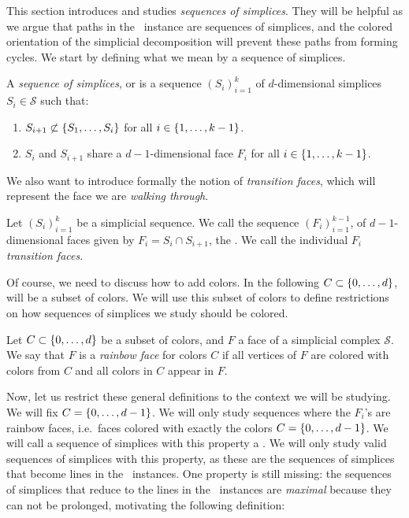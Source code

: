 This section introduces and studies \emph{sequences of simplices}.  They will be helpful as we argue that paths in the \EndOfLine\ instance are sequences of simplices, and the colored orientation of the simplicial decomposition will prevent these paths from forming cycles. We start by defining what we mean by a sequence of simplices.

\begin{definition}
	\label{def:sequence_of_simplices}
	A \emph{sequence of simplices}, or  is a sequence $\left(S_i\right)_{i=1}^{k}$ of $d$-dimensional simplices $S_i \in \mathcal{S}$ such that:
	\begin{enumerate}
		\item $S_{i+1} \not\subset \left\{S_1, \dots, S_i\right\}$ for all $i \in \left\{1, \dots, k-1\right\}$.
		\item $S_i$ and $S_{i+1}$ share a $d-1$-dimensional face $F_i$ for all $i \in \left\{1, \dots, k-1\right\}$.
	\end{enumerate}
\end{definition}

We also want to introduce formally the notion of \emph{transition faces}, which will represent the face we are \emph{walking through}.

\begin{definition}
	\label{def:transition_faces}
	Let $\left(S_i\right)_{i=1}^{k}$ be a simplicial sequence. We call the sequence $\left(F_i\right)_{i=1}^{k-1}$, of $d-1$-dimensional faces given by $F_i = S_i \cap S_{i+1}$, the . We call the individual $F_i$ \emph{transition faces}.
\end{definition}

Of course, we need to discuss how to add colors. In the following $C \subset \left\{0, \dots, d\right\}$, will be a subset of colors. We will use this subset of colors to define restrictions on how sequences of simplices we study should be colored.

\begin{definition}
	Let $C \subset \left\{0, \dots, d\right\}$ be a subset of colors, and $F$ a face of a simplicial complex $\mathcal{S}$. We say that $F$ is a \emph{rainbow face} for colors $C$ if all vertices of $F$ are colored with colors from $C$ and all colors in $C$ appear in $F$.
\end{definition}

Now, let us restrict these general definitions to the context we will be studying. We will fix $C = \left\{0, \dots, d-1\right\}$.  We will only study sequences where the $F_i$'s are rainbow faces, i.e.~faces colored with exactly the colors $C = \left\{0, \dots, d-1\right\}$. We will call a sequence of simplices with this property a . We will only study valid sequences of simplices with this property, as these are the sequences of simplices that become lines in the \EndOfLine\ instances. One property is still missing: the sequences of simplices that reduce to the lines in the \EndOfLine\ instances are \emph{maximal} because they can not be prolonged, motivating the following definition:

